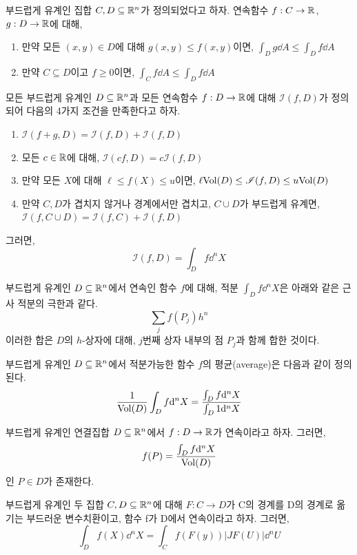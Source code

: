 \begin{theorem}
부드럽게 유계인 집합 $C,D\subseteq\mathbb{R}^n$가 정의되었다고 하자. 연속함수 $f:C\to\mathbb{R}$, $g:D\to\mathbb{R}$에 대해,
\begin{enumerate}[label=(\alph*)]
    \item 만약 모든 $(x,y)\in D$에 대해 $g(x,y)\le f(x,y)$이면, $\int_D g\dd A\le \int_D f\dd A$
    \item 만약 $C \subseteq D$이고 $f\ge 0$이면, $\int_C f\dd A\le \int_D f\dd A$
\end{enumerate}
\end{theorem}
\begin{theorem}
모든 부드럽게 유계인 $D\subseteq\mathbb{R}^n$과 모든 연속함수 $f:D\to\mathbb{R}$에 대해 $\mathscr{I}(f,D)$가 정의되어 다음의 4가지 조건을 만족한다고 하자.
\begin{enumerate}[label=(\alph*)]
    \item $\mathscr{I}(f+g,D)=\mathscr{I}(f,D)+\mathscr{I}(f,D)$
    \item 모든 $c\in\mathbb{R}$에 대해, $\mathscr{I}(cf,D)=c\mathscr{I}(f,D)$
    \item 만약 모든 $X$에 대해 $\ell\le f(X)\le u$이면, $\ell\mathrm{Vol}(D)\le \mathscr{I}(f,D)\le u \mathrm{Vol}(D)$
    \item 만약 $C,D$가 겹치지 않거나 경계에서만 겹치고, $C\cup D$가 부드럽게 유계면, $\mathscr{I}(f,C\cup D)=\mathscr{I}(f,C)+\mathscr{I}(f,D)$
\end{enumerate}
그러면,
$$
\mathscr{I}(f,D)=\int_Df\dd^nX
$$
\end{theorem}
\begin{theorem}
부드럽게 유계인 $D\subseteq\mathbb{R}^n$에서 연속인 함수 $f$에 대해, 적분 $\int_Df\dd^nX$은 아래와 같은 근사 적분의 극한과 같다.
$$
\sum_j f(P_j)h^n
$$
이러한 합은 $D$의 $h$-상자에 대해, $j$번째 상자 내부의 점 $P_j$과 함께 합한 것이다.
\end{theorem}
\begin{definition}[함수의 평균]
부드럽게 유계인 $D\subseteq\mathbb{R}^n$에서 적분가능한 함수 $f$의 평균(average)은 다음과 같이 정의된다.
$$
\frac{1}{\mathrm{Vol}(D)}\int_D f\dd^nX=\frac{\int_D f\dd^nX}{\int_D 1 \dd^nX}
$$
\end{definition}
\begin{theorem}
부드럽게 유계인 연결집합 $D\subseteq\mathbb{R}^n$에서 $f:D\to\mathbb{R}$가 연속이라고 하자. 그러면,
$$
f(P)=\frac{\int_Df\dd^nX}{\mathrm{Vol}(D)}
$$
인 $P \in D$가 존재한다.
\end{theorem}
\begin{theorem}
부드럽게 유계인 두 집합 $C, D\subseteq\mathbb{R}^n$에 대해 $F:C\to D$가 C의 경계를 D의 경계로 옮기는 부드러운 변수치환이고, 함수 f가 D에서 연속이라고 하자. 그러면,
$$
\int_Df(X)\dd^nX=\int_Cf(F(y))|JF(U)|\dd^nU
$$
\end{theorem}
